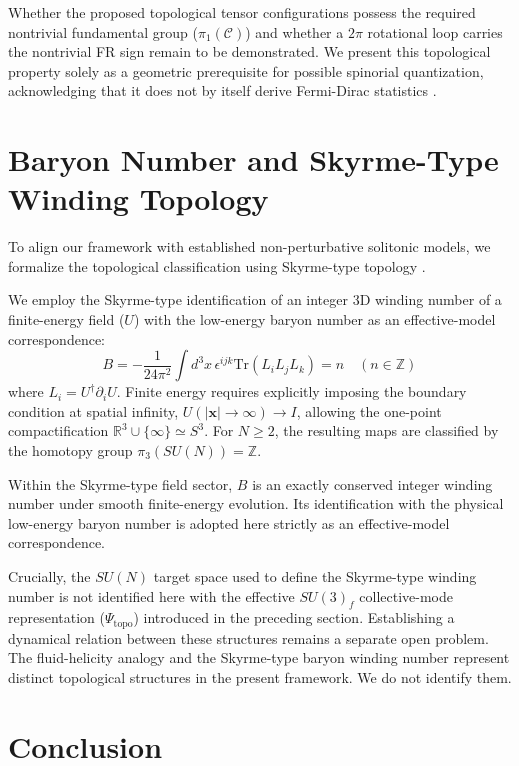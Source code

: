 \documentclass[reprint,amsmath,amssymb,aps,prd]{revtex4-2}
\begin{document}
Whether the proposed topological tensor configurations possess the required nontrivial fundamental group ($\pi_1(\mathcal{C})$) and whether a $2\pi$ rotational loop carries the nontrivial FR sign remain to be demonstrated. We present this topological property solely as a geometric prerequisite for possible spinorial quantization, acknowledging that it does not by itself derive Fermi-Dirac statistics \cite{Pauli1925}.

\section{Baryon Number and Skyrme-Type Winding Topology}

To align our framework with established non-perturbative solitonic models, we formalize the topological classification using Skyrme-type topology \cite{Skyrme1961, Adkins1983}.

We employ the Skyrme-type identification of an integer 3D winding number of a finite-energy field ($U$) with the low-energy baryon number as an effective-model correspondence:
\begin{equation}
B = -\frac{1}{24\pi^2} \int d^3x \, \epsilon^{ijk} \mathrm{Tr}(L_i L_j L_k) = n \quad (n \in \mathbb{Z})
\end{equation}
where $L_i = U^\dagger \partial_i U$. Finite energy requires explicitly imposing the boundary condition at spatial infinity, $U(|\mathbf{x}| \to \infty) \to I$, allowing the one-point compactification $\mathbb{R}^3 \cup \{\infty\} \simeq S^3$. For $N \ge 2$, the resulting maps are classified by the homotopy group $\pi_3(SU(N)) = \mathbb{Z}$.

Within the Skyrme-type field sector, $B$ is an exactly conserved integer winding number under smooth finite-energy evolution. Its identification with the physical low-energy baryon number is adopted here strictly as an effective-model correspondence. 

Crucially, the $SU(N)$ target space used to define the Skyrme-type winding number is not identified here with the effective $SU(3)_f$ collective-mode representation ($\Psi_{\mathrm{topo}}$) introduced in the preceding section. Establishing a dynamical relation between these structures remains a separate open problem. The fluid-helicity analogy and the Skyrme-type baryon winding number represent distinct topological structures in the present framework. We do not identify them.

\section{Conclusion}
\end{document}
